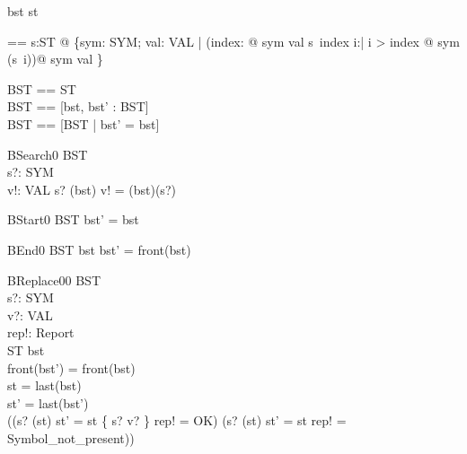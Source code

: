 \begin{zsection}
  \SECTION bst \parents st
\end{zsection}


\begin{axdef}
  \distro == \lambda s:\seq ST @
      \{sym: SYM; val: VAL | (\exists index: \nat @ sym \mapsto val \in s~index \land \forall i:\nat | i > index @ sym \notin \dom(s~i))@ sym \mapsto val \}
\end{axdef}

\begin{zed}
  BST == \seq ST \\
  \Delta BST == [bst, bst' : BST] \\
  \Xi BST == [\Delta BST | bst' = bst] \\
\end{zed}

\begin{schema}{BSearch0}
  \Xi BST \\
  s?: SYM \\
  v!: VAL
\where
  s? \in \dom(\distro bst) \land v! = (\distro bst)(s?)
\end{schema}

\begin{schema}{BStart0}
  \Delta BST
\where
  bst' = bst \cat \langle \emptyset \rangle
\end{schema}

\begin{schema}{BEnd0}
  \Delta BST
\where
  bst \neq \langle\rangle \land bst' = front(bst)
\end{schema}

\begin{schema}{BReplace00}
  \Delta BST \\
  s?: SYM \\
  v?: VAL \\
  rep!: Report \\
  \Delta ST
\where
  bst \neq \langle\rangle \\
  front(bst') = front(bst) \\
  st = last(bst) \\
  st' = last(bst') \\
  ((s? \in \dom(st) \land st' = st \oplus \{ s? \mapsto v? \} \land rep! = OK)
    \lor
    (s? \notin \dom(st) \land st' = st \land rep! = Symbol\_not\_present))
\end{schema}

